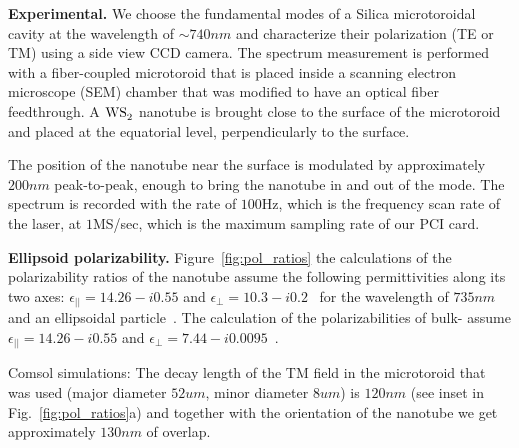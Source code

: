 \documentclass[journal=jacsat,manuscript=article]{achemso}
\begin{document}
\begin{suppinfo}

\textbf{Experimental.} We choose the fundamental modes of a Silica microtoroidal cavity at the wavelength of $\sim740nm$ and characterize their polarization (TE or TM) using a side view CCD camera.
The spectrum measurement is performed with a fiber-coupled microtoroid that is placed inside a scanning electron microscope (SEM) chamber that was modified to have an optical fiber feedthrough. A $\ce{WS_2}$ nanotube is brought close to the surface of the microtoroid and placed at the equatorial level, perpendicularly to the surface.

The position of the nanotube near the surface is modulated by approximately $200nm$ peak-to-peak, enough to bring the nanotube in and out of the mode. The spectrum is recorded with the rate of $100$Hz, which is the frequency scan rate of the laser, at $1$MS/sec, which is the maximum sampling rate of our PCI card.

\textbf{Ellipsoid polarizability.} Figure~\ref{fig:pol_ratios} the calculations of the polarizability ratios of the nanotube assume the following permittivities along its two axes: $\epsilon_{||}=14.26-i0.55$ and $\epsilon_{\perp}=10.3-i0.2$~\cite{taverna2002,kociak2001experimental} for the wavelength of $735nm$ and an ellipsoidal particle~\cite{hulst1957light}. The calculation of the polarizabilities of bulk- assume $\epsilon_{||}=14.26-i0.55$ and $\epsilon_{\perp}=7.44-i0.0095$~\cite{taverna2002}.

Comsol simulations: The decay length of the TM field in the microtoroid that was used (major diameter $52um$, minor diameter $8um$) is $120nm$  (see inset in Fig.~\ref{fig:pol_ratios}a) and together with the orientation of the nanotube we get approximately $130nm$ of overlap.


\end{suppinfo}
\end{document}
